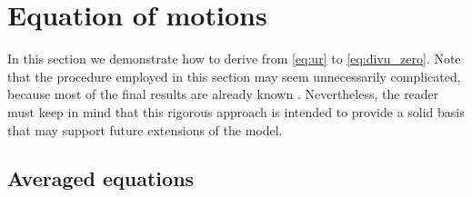 \section{Equation of motions}
\label{sec:averaged_equations}
In this section we demonstrate how to derive from \ref{eq:ur} to \ref{eq:divu_zero}. 
Note that the procedure employed in this section may seem unnecessarily complicated, because most of the final results are already known \citep{jackson2000}. 
Nevertheless, the reader must keep in mind that this rigorous approach is intended to provide a solid basis that may support future extensions of the model. 

\subsection{Averaged equations}

